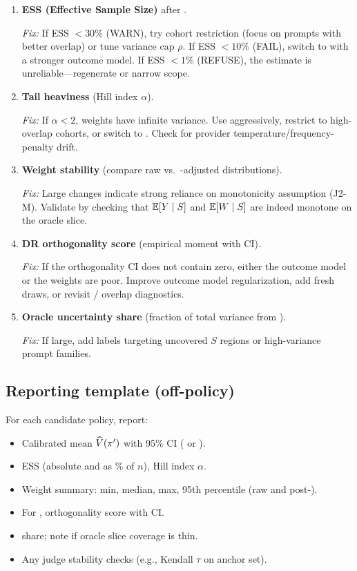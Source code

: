 \begin{enumerate}[label=(\alph*)]
\item \textbf{ESS (Effective Sample Size)} after \simcal.

\emph{Fix:} If ESS $< 30\%$ (WARN), try cohort restriction (focus on prompts with better overlap) or tune \simcal{} variance cap $\rho$. If ESS $< 10\%$ (FAIL), switch to \dr{} with a stronger outcome model. If ESS $< 1\%$ (REFUSE), the estimate is unreliable---regenerate or narrow scope.

\item \textbf{Tail heaviness} (Hill index $\alpha$).

\emph{Fix:} If $\alpha < 2$, weights have infinite variance. Use \simcal{} aggressively, restrict to high-overlap cohorts, or switch to \dr. Check for provider temperature/frequency-penalty drift.

\item \textbf{Weight stability} (compare raw vs.\ \simcal-adjusted distributions).

\emph{Fix:} Large changes indicate strong reliance on monotonicity assumption (J2-M). Validate by checking that $\operatorname{\mathbb{E}}[Y \mid S]$ and $\operatorname{\mathbb{E}}[W \mid S]$ are indeed monotone on the oracle slice.

\item \textbf{DR orthogonality score} (empirical moment with CI).

\emph{Fix:} If the orthogonality CI does not contain zero, either the outcome model or the weights are poor. Improve outcome model regularization, add fresh draws, or revisit \simcal{} / overlap diagnostics.

\item \textbf{Oracle uncertainty share} (fraction of total variance from \oua).

\emph{Fix:} If large, add labels targeting uncovered $S$ regions or high-variance prompt families.
\end{enumerate}

\subsection{Reporting template (off-policy)}

For each candidate policy, report:

\begin{itemize}
\item Calibrated mean $\widehat{V}(\pi')$ with 95\% CI (\ips{} or \dr).
\item ESS (absolute and as \% of $n$), Hill index $\alpha$.
\item Weight summary: min, median, max, 95th percentile (raw and post-\simcal).
\item For \dr, orthogonality score with CI.
\item \oua{} share; note if oracle slice coverage is thin.
\item Any judge stability checks (e.g., Kendall $\tau$ on anchor set).
\end{itemize}

